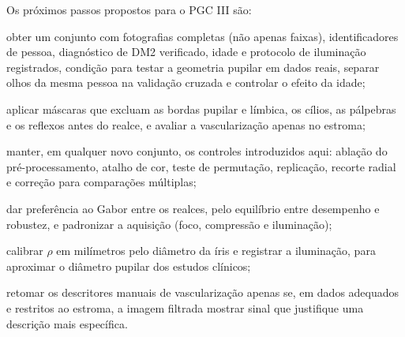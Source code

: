 Os próximos passos propostos para o PGC III são:
\begin{alineas}
  \item obter um conjunto com fotografias completas (não apenas faixas),
  identificadores de pessoa, diagnóstico de DM2 verificado, idade e protocolo
  de iluminação registrados, condição para testar a geometria pupilar em
  dados reais, separar olhos da mesma pessoa na validação cruzada e controlar
  o efeito da idade;
  \item aplicar máscaras que excluam as bordas pupilar e límbica, os cílios,
  as pálpebras e os reflexos antes do realce, e avaliar a vascularização
  apenas no estroma;
  \item manter, em qualquer novo conjunto, os controles introduzidos aqui:
  ablação do pré-processamento, atalho de cor, teste de permutação,
  replicação, recorte radial e correção para comparações múltiplas;
  \item dar preferência ao Gabor entre os realces, pelo equilíbrio entre
  desempenho e robustez, e padronizar a aquisição (foco, compressão e
  iluminação);
  \item calibrar $\rho$ em milímetros pelo diâmetro da íris e registrar a
  iluminação, para aproximar o diâmetro pupilar dos estudos clínicos;
  \item retomar os descritores manuais de vascularização apenas se, em dados
  adequados e restritos ao estroma, a imagem filtrada mostrar sinal que
  justifique uma descrição mais específica.
\end{alineas}
